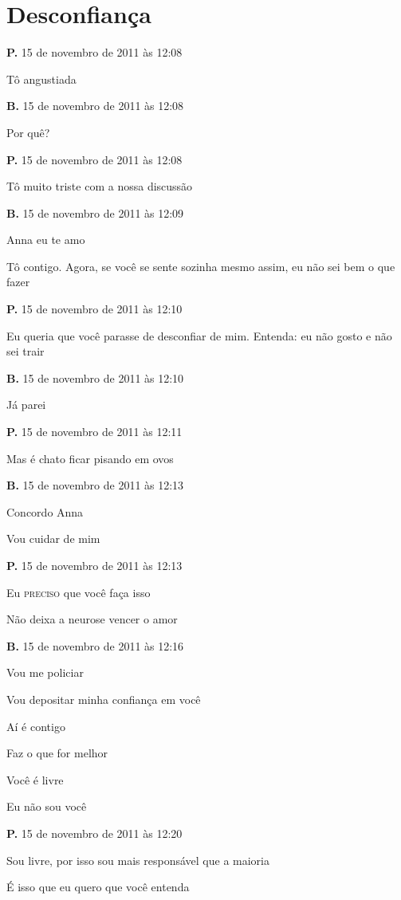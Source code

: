 \chapter{Desconfiança}

{\parindent0pt\parskip1pt\raggedright
\textbf{P.} 15 de novembro de 2011 às 12:08

Tô angustiada

\textbf{B.} 15 de novembro de 2011 às 12:08

Por quê?

\textbf{P.} 15 de novembro de 2011 às 12:08

Tô muito triste com a nossa discussão

\textbf{B.} 15 de novembro de 2011 às 12:09

Anna eu te amo

Tô contigo. Agora, se você se sente sozinha mesmo assim, eu não sei bem
o que fazer

\textbf{P.} 15 de novembro de 2011 às 12:10

Eu queria que você parasse de desconfiar de mim. Entenda: eu não gosto e
não sei trair

\textbf{B.} 15 de novembro de 2011 às 12:10

Já parei

\textbf{P.} 15 de novembro de 2011 às 12:11

Mas é chato ficar pisando em ovos

\textbf{B.} 15 de novembro de 2011 às 12:13

Concordo Anna

Vou cuidar de mim

\textbf{P.} 15 de novembro de 2011 às 12:13

Eu \textsc{preciso} que você faça isso

Não deixa a neurose vencer o amor

\textbf{B.} 15 de novembro de 2011 às 12:16

Vou me policiar

Vou depositar minha confiança em você

Aí é contigo

Faz o que for melhor

Você é livre

Eu não sou você

\textbf{P.} 15 de novembro de 2011 às 12:20

Sou livre, por isso sou mais responsável que a maioria

É isso que eu quero que você entenda

}
